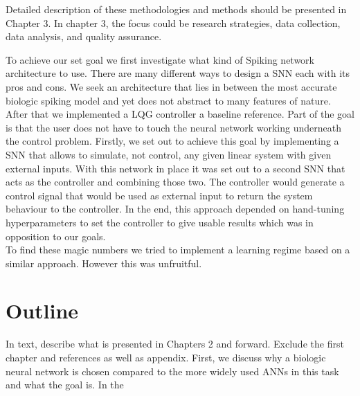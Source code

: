 Detailed description of these methodologies and methods should be presented in Chapter 3. In chapter 3, the focus could be research strategies, data collection, data analysis, and quality assurance.

To achieve our set goal we first investigate what kind of Spiking network architecture to use. There are many different ways to design a \ac{SNN} each with its pros and cons.
We seek an architecture that lies in between the most accurate biologic spiking model and yet does not abstract to many features of nature.\\
After that we implemented a LQG controller a baseline reference.
Part of the goal is that the user does not have to touch the neural network working underneath the control problem.
Firstly, we set out to achieve this goal by implementing a \ac{SNN} that allows to simulate, not control, any given linear system with given external inputs. With this network in place it was set out to a second \ac{SNN} that acts as the controller and combining those two. The controller would generate a control signal that would be used as external input to return the system behaviour to the controller. In the end, this approach depended on hand-tuning hyperparameters to set the controller to give usable results which was in opposition to our goals.\\

To find these magic numbers we tried to implement a learning regime based on a similar approach. However this was unfruitful.


\section{Outline}
In text, describe what is presented in Chapters 2 and forward. Exclude the first chapter and references as well as appendix.
First, we discuss why a biologic neural network is chosen compared to the more widely used \acp{ANN} in this task and what the goal is. In the